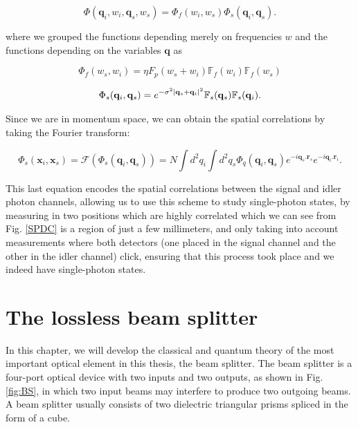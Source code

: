 \documentclass[12pt]{book}
\begin{document}
\begin{equation}
\Phi(\mathbf{q}_{i},w_{i},\mathbf{q}_{s},w_{s})=\Phi_{f}(w_{i},w_{s})\Phi_{s}(\mathbf{q}_{i},\mathbf{q}_{s}).
\end{equation}

where we grouped the functions depending merely on frequencies $w$  and the functions depending on the variables $\mathbf{q}$ as

\begin{equation}
\Phi_{f}(w_{s},w_{i})= \eta F_{p}(w_{s}+w_{i}) \mathbb{F}_{f}(w_{i})\mathbb{F}_{f}(w_{s})
\end{equation}

\begin{equation}
 \Phi_{s}(\mathbf{q}_{i},\mathbf{q}_{s})=e^{-\sigma^{2}\abs{\mathbf{q}_{s}+\mathbf{q}_{i}}^{2}}\mathbb{F}_{s}(\mathbf{q}_{s})\mathbb{F}_{s}(\mathbf{q}_{i}).
\end{equation}

Since we are in momentum space, we can obtain the spatial correlations by taking the Fourier transform:

\begin{equation}
\Phi_{s}(\mathbf{x}_{i},\mathbf{x}_{s})=\mathscr{F}(\Phi_{s}(\mathbf{q}_{i},\mathbf{q}_{s}))=N \int d^{2}q_{i} \int d^{2}q_{s} \Phi_{q}(\mathbf{q}_{i},\mathbf{q}_{s}) e^{-i \mathbf{q}_{s}.\mathbf{r}_{s}} e^{-i \mathbf{q}_{i}.\mathbf{r}_{i}}.
\end{equation}




This last equation encodes the spatial correlations between the signal and idler photon channels, allowing us to use this scheme to study single-photon states, by measuring in two positions which are highly correlated which we can see from Fig. \ref{SPDC} is a region of just a few millimeters, and only taking into account measurements where both detectors (one placed in the signal channel and the other in the idler channel) click, ensuring that this process took place and we indeed have single-photon states.


\section{The lossless beam splitter}


In this chapter, we will develop the classical and quantum theory of the most important optical element in this thesis, the beam splitter. The beam splitter is a four-port optical device with two inputs and two outputs, as shown in Fig. \ref{fig:BS}, in which two input beams may interfere to produce two outgoing beams. A beam splitter usually consists of two dielectric triangular prisms spliced in the form of a cube.
\end{document}
